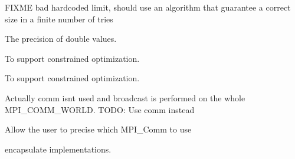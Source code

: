 \begin{DoxyRefList}
\label{todo__todo000024}%
%
F\+I\+X\+ME bad hardcoded limit, should use an algorithm that guarantee a correct size in a finite number of tries  
\item[Membre \mbox{\hyperlink{class_i_o_hprofiler__csv__logger_ae1f87543ebe3b26dc0d7b6b80a0dead6}{I\+O\+Hprofiler\+\_\+csv\+\_\+logger$<$ T $>$::write\+\_\+line}} (const size\+\_\+t evaluations, const double y, const double best\+\_\+so\+\_\+far\+\_\+y, const double transformed\+\_\+y, const double best\+\_\+so\+\_\+far\+\_\+transformed\+\_\+y)]\label{todo__todo000047}%
%
The precision of double values.  
\item[Membre \mbox{\hyperlink{class_i_o_hprofiler__problem_a8e341f89def43a2ef8408509626ebbf8}{I\+O\+Hprofiler\+\_\+problem$<$ Input\+Type $>$::reset\+\_\+problem}} ()]\label{todo__todo000040}%
%
To support constrained optimization. 

\label{todo__todo000046}%
%
To support constrained optimization.  
\item[Membre \mbox{\hyperlink{group___parallel_ga43a042b471a84b187c77bca43368db6a}{mpi::broadcast}} (communicator \&comm, int value, int root)]\label{todo__todo000032}%
%
Actually comm isn\textquotesingle{}t used and broadcast is performed on the whole M\+P\+I\+\_\+\+C\+O\+M\+M\+\_\+\+W\+O\+R\+LD. T\+O\+DO\+: Use comm instead  
\item[Membre \mbox{\hyperlink{classmpi_1_1communicator_a0e17d90b784f078d3e22a488290cb6aa}{mpi::communicator::communicator}} ()]\label{todo__todo000033}%
%
Allow the user to precise which M\+P\+I\+\_\+\+Comm to use  
\item[Fichier \mbox{\hyperlink{eo_2src_2serial_2_utils_8h}{Utils.h}} ]\label{todo__todo000034}%
%
encapsulate implementations.
\end{DoxyRefList}